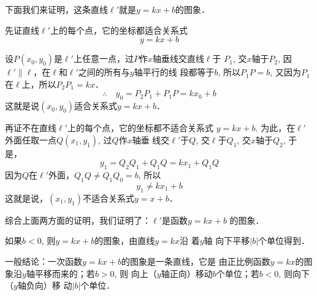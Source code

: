 \begin{figure}[htp]
    \centering
{}
    \caption{}
\end{figure}

下面我们来证明，这条直线$\ell'$就是$y=kx+b$的图象．

先证直线$\ell'$上的每个点，它的坐标都适合关系式
\[y=kx+b\]

设$P(x_0,y_0)$是$\ell'$上任意一点，过$P$作$x$轴垂线交直线$\ell$于
$P_1$, 交$x$轴于$P_2$, 因$\ell'\parallel \ell$，在$\ell$和$\ell'$之间的所有与$y$轴平行的线
段都等于$b$, 所以$P_1P=b$, 又因为$P_1$在$\ell$上，所以$P_2P_1=kx$．
\[\therefore\quad y_0=P_2P_1+P_1P=kx_0+b\]
这就是说$(x_0,y_0)$适合关系式$y=kx+b$．

再证不在直线$\ell'$上的每个点，它的坐标都不适合关系式
$y=kx+b$. 为此，在$\ell'$外面任取一点$Q(x_1,y_1)$, 过$Q$作$x$轴垂
线交$\ell'$于$Q$, 交$\ell$于$Q_1$, 交$x$轴于$Q_2$, 于是，
\[y_1=Q_2Q_1+Q_1Q=kx_1+Q_1Q\]
因为$Q$在$\ell'$外面，$Q_1Q\ne Q_1Q_0=b$, 所以
\[y_1\ne kx_1+b\]
这就是说，$(x_1,y_1)$不适合关系式$y=x+b$．

综合上面两方面的证明，我们证明了：$\ell'$是函数$y=kx+b$
的图象．

如果$b<0$, 则$y=kx+b$的图象，由直线$y=kx$沿 着$y$轴
向下平移$|b|$个单位得到．

一般结论：一次函数$y=kx+b$的图象是一条直线，它是
由正比例函数$y=kx$的图象沿$y$轴平移而来的；若$b>0$, 则
向上（$y$轴正向）移动$b$个单位；若$b<0$, 则向下（$y$轴负向）移
动$|b|$个单位．

